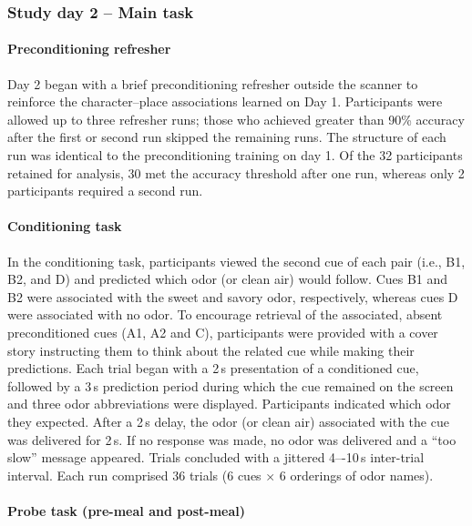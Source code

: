 \documentclass[12pt,letterpaper]{article}
\begin{document}
\subsubsection*{Study day 2 – Main task}



\paragraph*{Preconditioning refresher}

Day 2 began with a brief preconditioning refresher outside the scanner to reinforce the character–place associations learned on Day 1. Participants were allowed up to three refresher runs; those who achieved greater than 90\% accuracy after the first or second run skipped the remaining runs. The structure of each run was identical to the preconditioning training on day 1. Of the 32 participants retained for analysis, 30 met the accuracy threshold after one run, whereas only 2 participants required a second run.


\paragraph*{Conditioning task}

In the conditioning task, participants viewed the second cue of each pair (i.e., B1, B2, and D) and predicted which odor (or clean air) would follow. Cues B1 and B2 were associated with the sweet and savory odor, respectively, whereas cues D were associated with no odor. To encourage retrieval of the associated, absent preconditioned cues (A1, A2 and C), participants were provided with a cover story instructing them to think about the related cue while making their predictions. Each trial began with a 2\,s presentation of a conditioned cue, followed by a 3\,s prediction period during which the cue remained on the screen and three odor abbreviations were displayed. Participants indicated which odor they expected. After a 2\,s delay, the odor (or clean air) associated with the cue was delivered for 2\,s. If no response was made, no odor was delivered and a “too slow” message appeared. Trials concluded with a jittered 4–-10\,s inter-trial interval. Each run comprised 36 trials (6 cues $\times$ 6 orderings of odor names).


\paragraph*{Probe task (pre-meal and post-meal)}
\end{document}
